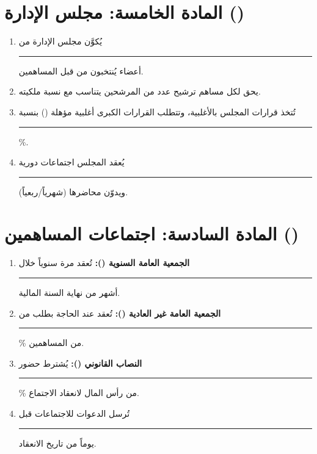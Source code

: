 \documentclass[12pt,a4paper]{article}
\begin{document}
\section{المادة الخامسة: مجلس الإدارة ()}
\label{sec:board}
\begin{enumerate}
    \item يُكوَّن مجلس الإدارة من \rule{2cm}{0.4pt} أعضاء يُنتخبون من قبل المساهمين.
    \item يحق لكل مساهم ترشيح عدد من المرشحين يتناسب مع نسبة ملكيته.
    \item تُتخذ قرارات المجلس بالأغلبية، وتتطلب القرارات الكبرى أغلبية مؤهلة () بنسبة \rule{2cm}{0.4pt}\%.
    \item يُعقد المجلس اجتماعات دورية \rule{2cm}{0.4pt} (شهرياً/ربعياً) ويدوّن محاضرها.
\end{enumerate}

\section{المادة السادسة: اجتماعات المساهمين ()}
\label{sec:meetings}
\begin{enumerate}
    \item \textbf{الجمعية العامة السنوية ():} تُعقد مرة سنوياً خلال \rule{2cm}{0.4pt} أشهر من نهاية السنة المالية.
    \item \textbf{الجمعية العامة غير العادية ():} تُعقد عند الحاجة بطلب من \rule{3cm}{0.4pt}\% من المساهمين.
    \item \textbf{النصاب القانوني ():} يُشترط حضور \rule{2cm}{0.4pt}\% من رأس المال لانعقاد الاجتماع.
    \item تُرسل الدعوات للاجتماعات قبل \rule{2cm}{0.4pt} يوماً من تاريخ الانعقاد.
\end{enumerate}

\end{document}
